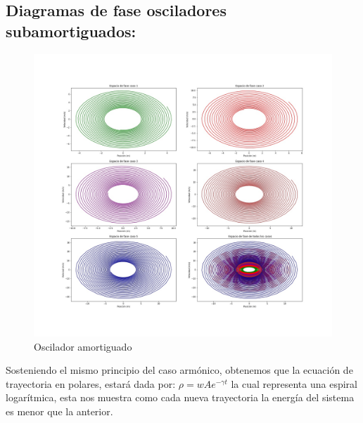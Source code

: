 \documentclass{article}
\begin{document}
\subsection{Diagramas de fase osciladores subamortiguados:}
\begin{figure}[htp]
    \centering
    \includegraphics[width=17cm]{Diagfaseosciladoramortiguado.jpg}
    \caption{Oscilador amortiguado}
    \label{fig:fase2}
\end{figure}

Sosteniendo el mismo principio del caso armónico, obtenemos que la ecuación de trayectoria en polares, estará dada por: $\rho=wAe^{-\gamma t}$ la cual representa una espiral logarítmica, esta nos muestra como cada nueva trayectoria la energía del sistema es menor que la anterior.
\end{document}
